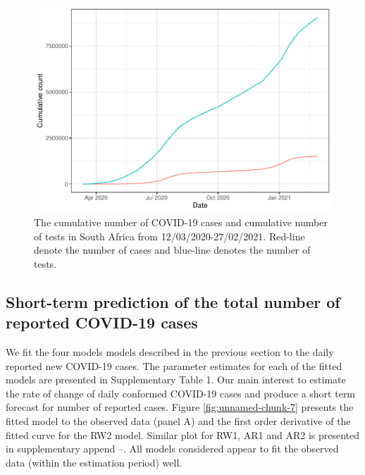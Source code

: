 \documentclass[10pt,letterpaper]{article}
\begin{document}
\begin{figure}[H]
\includegraphics[width=0.99\linewidth]{COVIDincidenceSA_files/figure-latex/cummulative-1} \caption{The cumulative number of COVID-19 cases and cumulative number of tests in South Africa from 12/03/2020-27/02/2021. Red-line denote the number of cases and blue-line denotes the number of tests.}\label{fig:cummulative}
\end{figure}

\hypertarget{short-term-prediction-of-the-total-number-of-reported-covid-19-cases}{%
\subsection{Short-term prediction of the total number of reported
COVID-19
cases}\label{short-term-prediction-of-the-total-number-of-reported-covid-19-cases}}

We fit the four models models described in the previous section to the daily
reported new COVID-19 cases. The parameter estimates for each of the fitted models
are presented in Supplementary Table 1. Our main interest to estimate the rate of change of daily conformed COVID-19 cases and produce a short term forecast for number of reported cases.  Figure \ref{fig:unnamed-chunk-7} presents the fitted model to the observed data (panel A) and the first order derivative of the fitted curve for the RW2 model. Similar plot for RW1, AR1 and AR2 is presented in supplementary append --. All models considered appear to fit the observed data (within the estimation period) well.
\end{document}
